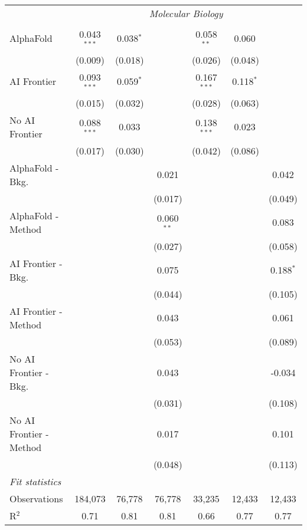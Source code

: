 \begin{tabular}{lcccccc}
 & \multicolumn{6}{c}{\textit{Molecular Biology}} \\ \\
   AlphaFold               & 0.043$^{***}$ & 0.038$^{*}$ &              & 0.058$^{**}$  & 0.060       &   \\   
                           & (0.009)       & (0.018)     &              & (0.026)       & (0.048)     &   \\   
   AI Frontier             & 0.093$^{***}$ & 0.059$^{*}$ &              & 0.167$^{***}$ & 0.118$^{*}$ &   \\   
                           & (0.015)       & (0.032)     &              & (0.028)       & (0.063)     &   \\   
   No AI Frontier          & 0.088$^{***}$ & 0.033       &              & 0.138$^{***}$ & 0.023       &   \\   
                           & (0.017)       & (0.030)     &              & (0.042)       & (0.086)     &   \\   
   AlphaFold - Bkg.        &               &             & 0.021        &               &             & 0.042\\   
                           &               &             & (0.017)      &               &             & (0.049)\\   
   AlphaFold - Method      &               &             & 0.060$^{**}$ &               &             & 0.083\\   
                           &               &             & (0.027)      &               &             & (0.058)\\   
   AI Frontier - Bkg.      &               &             & 0.075        &               &             & 0.188$^{*}$\\   
                           &               &             & (0.044)      &               &             & (0.105)\\   
   AI Frontier - Method    &               &             & 0.043        &               &             & 0.061\\   
                           &               &             & (0.053)      &               &             & (0.089)\\   
   No AI Frontier - Bkg.   &               &             & 0.043        &               &             & -0.034\\   
                           &               &             & (0.031)      &               &             & (0.108)\\   
   No AI Frontier - Method &               &             & 0.017        &               &             & 0.101\\   
                           &               &             & (0.048)      &               &             & (0.113)\\   
   \midrule
   \emph{Fit statistics}\\
   Observations            & 184,073       & 76,778      & 76,778       & 33,235        & 12,433      & 12,433\\  
   R$^2$                   & 0.71          & 0.81        & 0.81         & 0.66          & 0.77        & 0.77\\  
   

\end{tabular}
